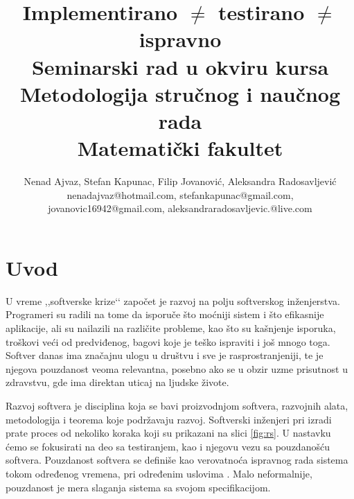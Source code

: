 \documentclass[a4paper]{article}
\begin{document}
\title{Implementirano $\neq$ testirano $\neq$ ispravno\\ \small{Seminarski rad u okviru kursa\\Metodologija stručnog i naučnog rada\\ Matematički fakultet}}

\author{\normalsize{Nenad Ajvaz, Stefan Kapunac, Filip Jovanović, Aleksandra Radosavljević}\\
\normalsize{nenadajvaz@hotmail.com, stefankapunac@gmail.com,}\\
\normalsize{jovanovic16942@gmail.com, aleksandraradosavljevic.@live.com}
}


\maketitle


\tableofcontents

\newpage

\section{Uvod}
\label{sec:uvod}

U vreme ,,softverske krize‘‘ započet je razvoj na polju softverskog inženjerstva.
Programeri su radili na tome da isporuče što moćniji sistem i što efikasnije aplikacije, ali su nailazili na različite probleme, kao što su kašnjenje isporuka, troškovi veći od predviđenog, bagovi koje je teško ispraviti i još mnogo toga.
Softver danas ima značajnu ulogu u društvu i sve je rasprostranjeniji, te je njegova pouzdanost veoma relevantna, posebno ako se u obzir uzme prisutnost u zdravstvu, gde ima direktan uticaj na ljudske živote.

Razvoj softvera je disciplina koja se bavi proizvodnjom softvera, razvojnih alata, metodologija i teorema koje podržavaju razvoj.
Softverski inženjeri pri izradi prate proces od nekoliko koraka koji su prikazani na slici \ref{fig:rs}.
U nastavku ćemo se fokusirati na deo sa testiranjem, kao i njegovu vezu sa pouzdanošću softvera.
Pouzdanost softvera se definiše kao verovatnoća ispravnog rada sistema tokom određenog vremena, pri određenim uslovima \cite{pham_reliability}.
Malo neformalnije, pouzdanost je mera slaganja sistema sa svojom specifikacijom.
\end{document}
